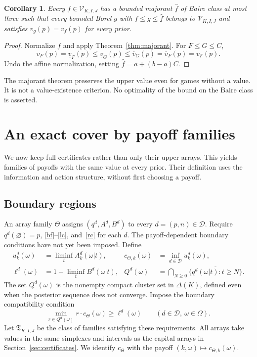 \documentclass[11pt,a4paper]{article}
\newtheorem{corollary}[theorem]{Corollary}
\theoremstyle{definition}
\theoremstyle{remark}
\newcommand{\lv}{\underline v}
\newcommand{\uv}{\overline v}
\newcommand{\DD}{\mathcal D}
\newcommand{\VV}{\mathcal V}
\begin{document}
\begin{corollary}\label{cor:interval}
Every $f\in\VV_{K,I,J}$ has a bounded majorant $\widehat f$ of Baire
class at most three such that every bounded Borel $g$ with
$f\leq g\leq\widehat f$ belongs to $\VV_{K,I,J}$ and satisfies
$v_g(p)=v_f(p)$ for every prior.
\end{corollary}
\begin{proof}
Normalize $f$ and apply Theorem~\ref{thm:majorant}. For $F\leq G\leq C$,
\[
 v_F(p)=\lv_F(p)\leq\lv_G(p)\leq\uv_G(p)=\uv_F(p)=v_F(p).
\]
Undo the affine normalization, setting $\widehat f=a+(b-a)C$.
\end{proof}

The majorant theorem preserves the upper value even for games without
a value. It is not a value-existence criterion. No optimality of the
bound on the Baire class is asserted.

\section{An exact cover by payoff families}\label{sec:families}

We now keep full certificates rather than only their upper arrays.
This yields families of payoffs with the same value at every prior.
Their definition uses the information and action structure, without
first choosing a payoff.

\subsection{Boundary regions}

An array family $\Theta$ assigns $(q^d,A^d,B^d)$ to every
$d=(p,n)\in\DD$. Require $q^d(\varnothing)=p$,
\eqref{bf}--\eqref{lc}, and~\eqref{rc} for each $d$.
The payoff-dependent boundary conditions have not yet been imposed.
Define
\begin{align*}
 u^d_k(\omega)&=\liminf_t A^d_k(\omega|t),&
 c_{\Theta,k}(\omega)&=\inf_{d\in\DD}u^d_k(\omega),\\
 \ell^d(\omega)&=1-\liminf_tB^d(\omega|t),&
 Q^d(\omega)&=\bigcap_{N\geq0}
       \overline{\{q^d(\omega|t):t\geq N\}}.
\end{align*}
The set $Q^d(\omega)$ is the nonempty compact cluster set in
$\Delta(K)$, defined even when the posterior sequence does not converge.
Impose the boundary compatibility condition
\begin{equation}\label{eq:bc}\tag{BC}
 \min_{r\in Q^d(\omega)}r\cdot c_\Theta(\omega)
                  \geq\ell^d(\omega)\qquad(d\in\DD,\ \omega\in\Omega).
\end{equation}
Let $\mathfrak T_{K,I,J}$ be the class of families satisfying these
requirements. All arrays take values in the same simplexes and
intervals as the capital arrays in Section~\ref{sec:certificates}.
We identify $c_\Theta$ with the payoff $(k,\omega)\mapsto c_{\Theta,k}(\omega)$.
\end{document}
